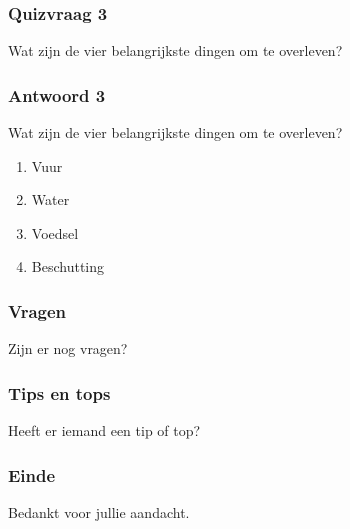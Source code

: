 \documentclass[a4paper, handout]{beamer}
\begin{document}
\begin{frame}
	\frametitle{Quizvraag 3}
	Wat zijn de vier belangrijkste dingen om te overleven?
\end{frame}

\begin{frame}
	\frametitle{Antwoord 3}
	Wat zijn de vier belangrijkste dingen om te overleven?
	\begin{enumerate}
		\item{Vuur}
		\item{Water}
		\item{Voedsel}
		\item{Beschutting}
	\end{enumerate}
\end{frame}

\begin{frame}
	\frametitle{Vragen}
	Zijn er nog vragen?
\end{frame}

\begin{frame}
	\frametitle{Tips en tops}
	Heeft er iemand een tip of top?
\end{frame}

\begin{frame}
	\frametitle{Einde}
	Bedankt voor jullie aandacht.	
\end{frame}
\end{document}
